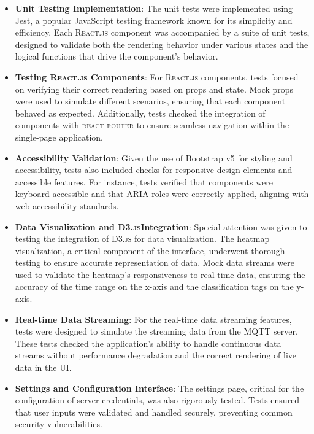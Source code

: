 \begin{itemize}
  \item \textbf{Unit Testing Implementation}: The unit tests were implemented using Jest, a popular JavaScript testing framework known for its simplicity and efficiency. Each \textsc{React.js} component was accompanied by a suite of unit tests, designed to validate both the rendering behavior under various states and the logical functions that drive the component's behavior.
  \item \textbf{Testing \textsc{React.js} Components}: For \textsc{React.js} components, tests focused on verifying their correct rendering based on props and state. Mock props were used to simulate different scenarios, ensuring that each component behaved as expected. Additionally, tests checked the integration of components with \textsc{react-router} to ensure seamless navigation within the single-page application.
  \item \textbf{Accessibility Validation}: Given the use of Bootstrap v5 for styling and accessibility, tests also included checks for responsive design elements and accessible features. For instance, tests verified that components were keyboard-accessible and that ARIA roles were correctly applied, aligning with web accessibility standards.
  \item \textbf{Data Visualization and \textsc{D3.js}Integration}: Special attention was given to testing the integration of \textsc{D3.js} for data visualization. The heatmap visualization, a critical component of the interface, underwent thorough testing to ensure accurate representation of data. Mock data streams were used to validate the heatmap's responsiveness to real-time data, ensuring the accuracy of the time range on the x-axis and the classification tags on the y-axis.
  \item \textbf{Real-time Data Streaming}: For the real-time data streaming features, tests were designed to simulate the streaming data from the MQTT server. These tests checked the application's ability to handle continuous data streams without performance degradation and the correct rendering of live data in the UI.
  \item \textbf{Settings and Configuration Interface}: The settings page, critical for the configuration of server credentials, was also rigorously tested. Tests ensured that user inputs were validated and handled securely, preventing common security vulnerabilities.
\end{itemize}

